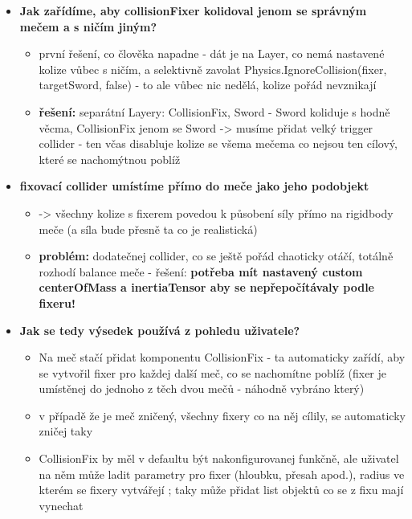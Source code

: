 \begin{itemize}
\begin{itemize}
    \item \textbf{Jak zařídíme, aby collisionFixer kolidoval jenom se správným mečem a s ničím jiným?}
      \begin{itemize}
        \item první řešení, co člověka napadne - dát je na Layer, co nemá nastavené kolize vůbec s ničím, a selektivně zavolat Physics.IgnoreCollision(fixer, targetSword, false) - to ale vůbec nic nedělá, kolize pořád nevznikají
        \item \textbf{řešení:} separátní Layery: CollisionFix, Sword - Sword koliduje s hodně věcma, CollisionFix jenom se Sword -> musíme přidat velký trigger collider - ten včas disabluje kolize se všema mečema co nejsou ten cílový, které se nachomýtnou poblíž
      \end{itemize}
    \item \textbf{fixovací collider umístíme přímo do meče jako jeho podobjekt}
      \begin{itemize}
        \item -> všechny kolize s fixerem povedou k působení síly přímo na rigidbody meče (a síla bude přesně ta co je realistická)
        \item \textbf{problém:} dodatečnej collider, co se ještě pořád chaoticky otáčí, totálně rozhodí balance meče - řešení: \textbf{potřeba mít nastavený custom centerOfMass a inertiaTensor aby se nepřepočítávaly podle fixeru!} 
      \end{itemize}
    \item \textbf{Jak se tedy výsedek používá z pohledu uživatele?}
      \begin{itemize}
        \item Na meč stačí přidat komponentu CollisionFix - ta automaticky zařídí, aby se vytvořil fixer pro každej další meč, co se nachomítne poblíž (fixer je umístěnej do jednoho z těch dvou mečů - náhodně vybráno který)
        \item v případě že je meč zničený, všechny fixery co na něj cílily, se automaticky zničej taky
        \item CollisionFix by měl v defaultu být nakonfigurovanej funkčně, ale uživatel na něm může ladit parametry pro fixer (hloubku, přesah apod.), radius ve kterém se fixery vytvářejí ; taky může přidat list objektů co se z fixu mají vynechat
      \end{itemize}
  \end{itemize}
\end{itemize}


